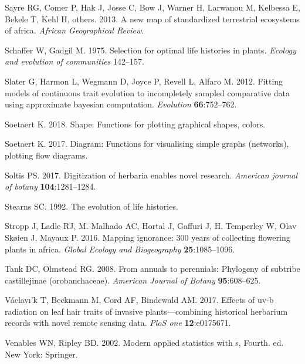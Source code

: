 \documentclass[man,floatsintext]{apa6}
\theoremstyle{definition}
\theoremstyle{definition}
\theoremstyle{definition}
\theoremstyle{remark}
\begin{document}
\leavevmode\hypertarget{ref-sayre2013new}{}%
Sayre RG, Comer P, Hak J, Josse C, Bow J, Warner H, Larwanou M, Kelbessa
E, Bekele T, Kehl H, others. 2013. A new map of standardized terrestrial
ecosystems of africa. \emph{African Geographical Review}.

\leavevmode\hypertarget{ref-schaffer1975selection}{}%
Schaffer W, Gadgil M. 1975. Selection for optimal life histories in
plants. \emph{Ecology and evolution of communities} 142--157.

\leavevmode\hypertarget{ref-R-geiger_c}{}%
Slater G, Harmon L, Wegmann D, Joyce P, Revell L, Alfaro M. 2012.
Fitting models of continuous trait evolution to incompletely sampled
comparative data using approximate bayesian computation.
\emph{Evolution} \textbf{66}:752--762.

\leavevmode\hypertarget{ref-R-shape}{}%
Soetaert K. 2018. Shape: Functions for plotting graphical shapes,
colors.

\leavevmode\hypertarget{ref-R-diagram}{}%
Soetaert K. 2017. Diagram: Functions for visualising simple graphs
(networks), plotting flow diagrams.

\leavevmode\hypertarget{ref-soltis2017digitization}{}%
Soltis PS. 2017. Digitization of herbaria enables novel research.
\emph{American journal of botany} \textbf{104}:1281--1284.

\leavevmode\hypertarget{ref-stearns1992evolution}{}%
Stearns SC. 1992. The evolution of life histories.

\leavevmode\hypertarget{ref-stropp2016mapping}{}%
Stropp J, Ladle RJ, M. Malhado AC, Hortal J, Gaffuri J, H. Temperley W,
Olav Skøien J, Mayaux P. 2016. Mapping ignorance: 300 years of
collecting flowering plants in africa. \emph{Global Ecology and
Biogeography} \textbf{25}:1085--1096.

\leavevmode\hypertarget{ref-tank2008annuals}{}%
Tank DC, Olmstead RG. 2008. From annuals to perennials: Phylogeny of
subtribe castillejinae (orobanchaceae). \emph{American Journal of
Botany} \textbf{95}:608--625.

\leavevmode\hypertarget{ref-vaclavik2017effects}{}%
Václavı'k T, Beckmann M, Cord AF, Bindewald AM. 2017. Effects of uv-b
radiation on leaf hair traits of invasive plants---combining historical
herbarium records with novel remote sensing data. \emph{PloS one}
\textbf{12}:e0175671.

\leavevmode\hypertarget{ref-R-MASS}{}%
Venables WN, Ripley BD. 2002. Modern applied statistics with s, Fourth.
ed. New York: Springer.
\end{document}
